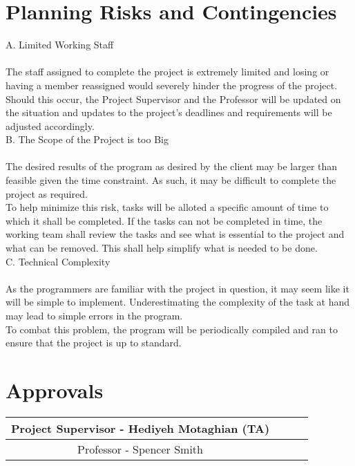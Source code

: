 \documentclass[12pt, letterpaper]{article}
\begin{document}
	\section{Planning Risks and Contingencies}
	
	\noindent A. \indent Limited Working Staff\\
	\\
	\indent The staff assigned to complete the project is extremely limited and losing or having a member reassigned would severely hinder the progress of the project.\\
	\indent Should this occur, the Project Supervisor and the Professor will be updated on the situation and updates to the project's deadlines and requirements will be adjusted accordingly.\\
	
	\noindent B. \indent The Scope of the Project is too Big\\
	\\
	\indent The desired results of the program as desired by the client may be larger than feasible given the time constraint. As such, it may be difficult to complete the project as required.\\
	\indent To help minimize this risk, tasks will be alloted a specific amount of time to which it shall be completed. If the tasks can not be completed in time, the working team shall review the tasks and see what is essential to the project and what can be removed. This shall help simplify what is needed to be done.\\
	
	\noindent C. \indent Technical Complexity\\
	\\
	\indent As the programmers are familiar with the project in question, it may seem like it will be simple to implement. Underestimating the complexity of the task at hand may lead to simple errors in the program.\\
	\indent To combat this problem, the program will be periodically compiled and ran to ensure that the project is up to standard.
	
	\section{Approvals}
	
		\begin{tabular}{ |c|c|c|c| } 
			\hline
			Project Supervisor - Hediyeh Motaghian (TA) & \indent \indent \indent \indent \indent \indent \indent \indent \indent\\
			\hline
			Professor - Spencer Smith &\\
			\hline
		\end{tabular}
	
\end{document}
